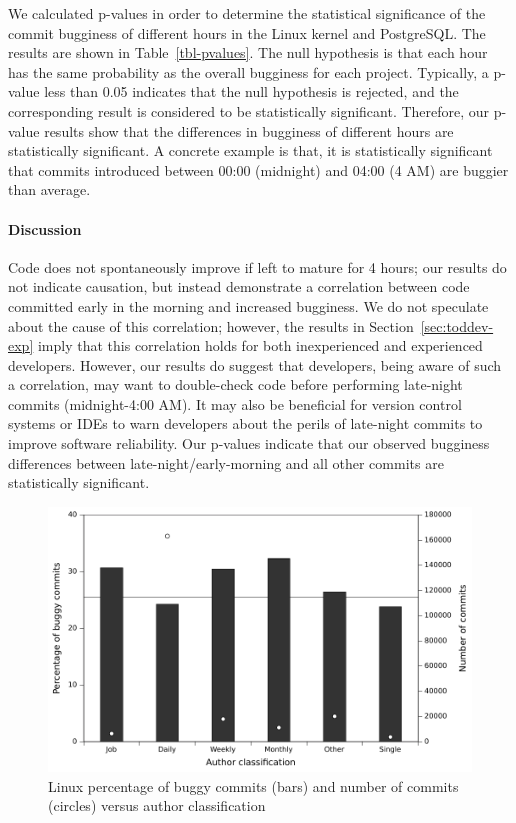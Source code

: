 We calculated p-values in order to determine the statistical significance of
the commit bugginess of different hours in the Linux kernel and PostgreSQL. 
The results are shown in Table~\ref{tbl-pvalues}. The null hypothesis is that 
each hour has the same probability as the overall bugginess for each project. 
Typically, a p-value less than 0.05 indicates that 
the null hypothesis is rejected, and the corresponding result 
is considered to be statistically significant.
Therefore, our p-value results show that the differences in bugginess of 
different hours are statistically significant. A concrete example is that, 
it is statistically significant that commits introduced 
between 00:00 (midnight) and 04:00 (4 AM) are buggier than average. 

\paragraph{Discussion}

Code does not spontaneously improve if left to mature for 4 hours; 
our results do not indicate causation,
but instead demonstrate a correlation between code committed early in the 
morning and increased bugginess. We do not speculate about the cause
of this correlation; however, the results in Section~\ref{sec:toddev-exp}
imply that this correlation holds for both inexperienced and experienced
developers.
However, our results do suggest that developers, being aware of such a 
correlation, may want to double-check code before performing
late-night commits (midnight-4:00 AM). It may also be
beneficial for version control systems or IDEs to warn developers about
the perils of late-night
commits to improve software reliability. 
Our p-values indicate that our
observed bugginess differences between late-night/early-morning and all other commits are statistically significant.

\begin{figure}[t!hb]
\begin{center}
\includegraphics[width=\columnwidth]{linux-bugginess-author-class.pdf}
\end{center}
\caption{\label{fig-linux-bugginess-author-class}Linux percentage of buggy
 commits (bars) and number of commits (circles) versus author classification}
\end{figure}

